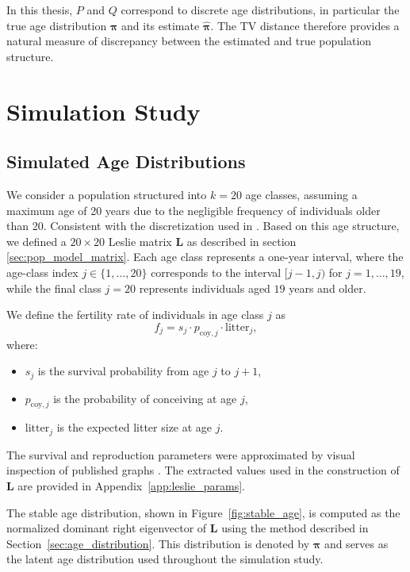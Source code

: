 \documentclass[11pt,a4paper]{article}
\begin{document}
In this thesis, $P$ and $Q$ correspond to discrete age distributions, in particular the true age distribution $\boldsymbol{\pi}$ and its estimate $\hat{\boldsymbol{\pi}}$. The TV distance therefore provides a natural measure of discrepancy between the estimated and true population structure.


\section{Simulation Study} \label{sec:simulation_study}

\subsection{Simulated Age Distributions}

We consider a population structured into $k = 20$ age classes, assuming a maximum age of 20 years due to the negligible frequency of individuals older than 20. Consistent with the discretization used in \cite{nina_bearmodel}. Based on this age structure, we defined a $20 \times 20$ Leslie matrix $\mathbf{L}$ as described in section \ref{sec:pop_model_matrix}. Each age class represents a one-year interval, where the age-class index $j \in \{1,\dots,20\}$ corresponds to the interval $[j-1, j)$ for $j = 1,\dots,19$, while the final class $j=20$ represents individuals aged $19$ years and older.

We define the fertility rate of individuals in age class $j$ as
\begin{equation*}
	f_j = s_j \cdot p_{\text{coy},j} \cdot \text{litter}_j,
\end{equation*}
where:
\begin{itemize}
	\item $s_j$ is the survival probability from age $j$ to $j+1$,
	\item $p_{\text{coy},j}$ is the probability of conceiving at age $j$,
	\item $\text{litter}_j$ is the expected litter size at age $j$.
\end{itemize}
The survival and reproduction parameters were approximated by visual inspection of published graphs \cite{nina_bearmodel}. The extracted values used in the construction of $\mathbf{L}$ are provided in Appendix~\ref{app:leslie_params}.

The stable age distribution, shown in Figure~\ref{fig:stable_age}, is computed as the normalized dominant right eigenvector of $\mathbf{L}$ using the method described in Section~\ref{sec:age_distribution}. This distribution is denoted by $\boldsymbol{\pi}$ and serves as the latent age distribution used throughout the simulation study.
\end{document}
